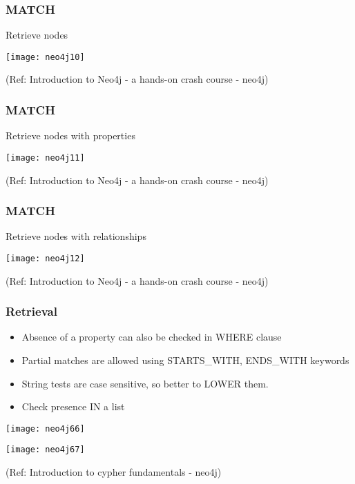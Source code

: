 \begin{frame}[fragile]\frametitle{MATCH}

Retrieve nodes

\begin{center}
\texttt{[image: neo4j10]}
\end{center}	  


{\tiny (Ref: Introduction to Neo4j - a hands-on crash course  - neo4j)}

\end{frame}

\begin{frame}[fragile]\frametitle{MATCH}

Retrieve nodes with properties

\begin{center}
\texttt{[image: neo4j11]}
\end{center}	  


{\tiny (Ref: Introduction to Neo4j - a hands-on crash course  - neo4j)}

\end{frame}

\begin{frame}[fragile]\frametitle{MATCH}

Retrieve nodes with relationships

\begin{center}
\texttt{[image: neo4j12]}
\end{center}	  


{\tiny (Ref: Introduction to Neo4j - a hands-on crash course  - neo4j)}

\end{frame}

\begin{frame}[fragile]\frametitle{Retrieval}


\begin{itemize}
\item Absence of a property can also be checked in WHERE clause
\item Partial matches are allowed using STARTS\_WITH, ENDS\_WITH keywords
\item String tests are case sensitive, so better to LOWER them.
\item Check presence IN a list
\end{itemize}


\begin{center}
\texttt{[image: neo4j66]}

\texttt{[image: neo4j67]}

\end{center}	  


{\tiny (Ref: Introduction to cypher fundamentals  - neo4j)}

\end{frame}

